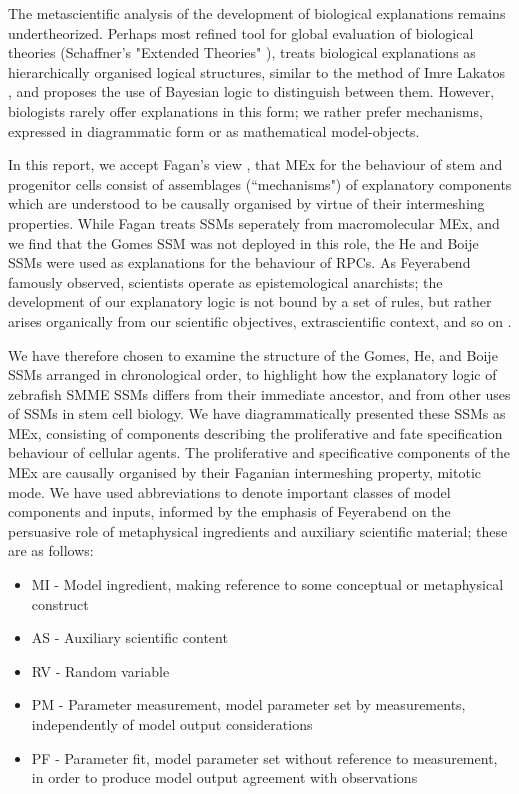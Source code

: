 The metascientific analysis of the development of biological explanations remains undertheorized. Perhaps most refined tool for global evaluation of biological theories (Schaffner's "Extended Theories" \cite{Schaffner1993}), treats biological explanations as hierarchically organised logical structures, similar to the method of Imre Lakatos \cite{Lakatos1976}, and proposes the use of Bayesian logic to distinguish between them. However, biologists rarely offer explanations in this form; we rather prefer mechanisms, expressed in diagrammatic form or as mathematical model-objects.

In this report, we accept Fagan's view \cite{Fagan2015}, that MEx for the behaviour of stem and progenitor cells consist of assemblages (``mechanisms") of explanatory components which are understood to be causally organised by virtue of their intermeshing properties. While Fagan treats SSMs seperately from macromolecular MEx, and we find that the Gomes SSM was not deployed in this role, the He and Boije SSMs were used as explanations for the behaviour of RPCs. As Feyerabend famously observed, scientists operate as epistemological anarchists; the development of our explanatory logic is not bound by a set of rules, but rather arises organically from our scientific objectives, extrascientific context, and so on \cite{Feyerabend1993}.
 
We have therefore chosen to examine the structure of the Gomes, He, and Boije SSMs arranged in chronological order, to highlight how the explanatory logic of zebrafish SMME SSMs differs from their immediate ancestor, and from other uses of SSMs in stem cell biology. We have diagrammatically presented these SSMs as MEx, consisting of components describing the proliferative and fate specification behaviour of cellular agents. The proliferative and specificative components of the MEx are causally organised by their Faganian intermeshing property, mitotic mode. We have used abbreviations to denote important classes of model components and inputs, informed by the emphasis of Feyerabend on the persuasive role of metaphysical ingredients and auxiliary scientific material; these are as follows:

 \begin{itemize}
	\item{MI - Model ingredient, making reference to some conceptual or metaphysical construct}
	\item{AS - Auxiliary scientific content}
	\item{RV - Random variable}
	\item{PM - Parameter measurement, model parameter set by measurements, independently of model output considerations}
	\item{PF - Parameter fit, model parameter set without reference to measurement, in order to produce model output agreement with observations}
\end{itemize}

